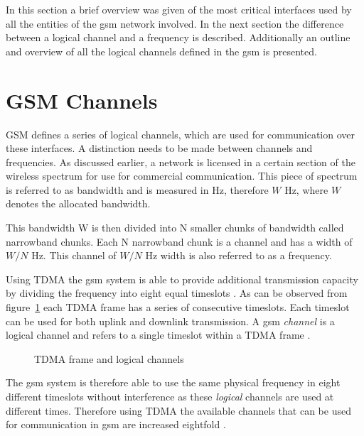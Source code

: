 In this section a brief overview was given of the most critical interfaces used by all the entities of the \gls{gsm} network involved. In the next section the difference between a logical channel and a frequency is described. Additionally an outline and overview of all the logical channels defined in the \gls{gsm} is presented. 
\section{GSM Channels}
\label{sec:interfacech}
GSM defines a series of logical channels, which are used for communication over these interfaces. A distinction needs to be made between channels and frequencies. As discussed earlier, a network is licensed in a certain section of the wireless spectrum for use for commercial communication. This piece of spectrum is referred to as bandwidth and is measured in Hz, therefore $W$ Hz, where $W$ denotes the allocated bandwidth\cite{FundamentalsWirelessCommunication}.

This bandwidth W is then divided into N smaller chunks of bandwidth called narrowband chunks. Each N narrowband chunk is a channel and has a width of $W/N$ Hz\cite{FundamentalsWirelessCommunication}. This channel of $W/N$ Hz width is also referred to as a frequency.\label{def:channel}

Using \gls{TDMA} the \gls{gsm} system is able to provide additional transmission capacity by dividing the frequency into eight equal timeslots \cite{wirelesstelcoMullet}. 
As can be observed from figure~\ref{fig:GSMChannels} each \gls{TDMA} frame has a series of consecutive timeslots. Each timeslot can be used for both uplink and downlink transmission. A \gls{gsm} \emph{channel} is a logical channel and refers to a single timeslot within a \gls{TDMA} frame \cite{wirelesstelcoMullet,GSMArchitectureProtocolsServices}.
\begin{figure}[H]
	\begin{centering}
		
		\caption{TDMA frame and logical channels \cite{wirelesstelcoMullet}}
		\label{fig:GSMChannels}
	\end{centering}
\end{figure}
The \gls{gsm} system is therefore able to use the same physical frequency in eight different timeslots without interference as these \emph{logical} channels are used at different times. Therefore using \gls{TDMA} the available channels that can be used for communication in \gls{gsm} are increased eightfold \cite{wirelesstelcoMullet}.

